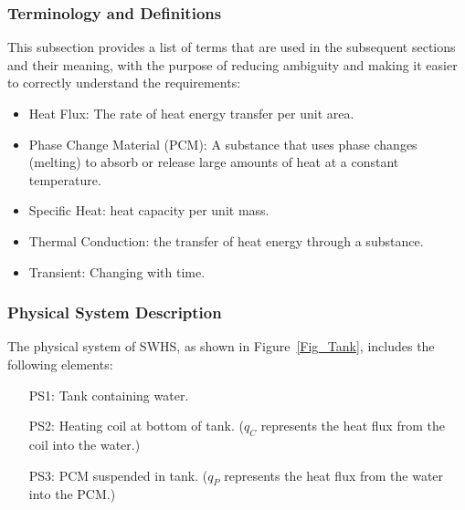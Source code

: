 \documentclass[12pt]{article}
\newcommand{\progname}{SWHS}
\begin{document}

\subsubsection{Terminology and  Definitions}

This subsection provides a list of terms that are used in the subsequent
sections and their meaning, with the purpose of reducing ambiguity and making it
easier to correctly understand the requirements:

\begin{itemize}

\item Heat Flux: The rate of heat energy transfer per unit area.

\item Phase Change Material (PCM): A substance that uses phase changes (melting)
  to absorb or release large amounts of heat at a constant temperature.

\item Specific Heat: heat capacity per unit mass.

\item Thermal Conduction: the transfer of heat energy through a substance.

\item Transient: Changing with time.

\end{itemize}

\subsubsection{Physical System Description}

The physical system of \progname{}, as shown in Figure~\ref{Fig_Tank},
includes the following elements:

\begin{itemize}

\item[PS1:] Tank containing water.

\item[PS2:] Heating coil at bottom of tank.  ($q_C$ represents the heat flux
  from the coil into the water.)

\item[PS3:] PCM suspended in tank.  ($q_P$ represents
  the heat flux from the water into the PCM.)

\end{itemize}
\end{document}
